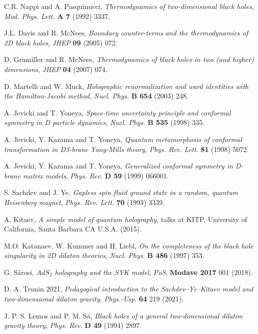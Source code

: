 \documentclass[sn-mathphys,Numbered]{sn-jnl}%
\theoremstyle{thmstyleone}%
\theoremstyle{thmstyletwo}%
\theoremstyle{thmstylethree}%
\begin{document}
\begin{thebibliography}{99}
 C.R. Nappi and A. Pasquinucci, \emph{Thermodynamics of two-dimensional black holes}, \emph{Mod. Phys.
Lett.} {\bf A 7} (1992) 3337.

 J.L. Davis and R. McNees, \emph{Boundary counter-terms and the thermodynamics of 2D black
holes}, \emph{JHEP} {\bf 09} (2005) 072.

 D. Grumiller and R. McNees, \emph{Thermodynamics of black holes in two (and higher) dimensions}, \emph{JHEP} {\bf 04} (2007) 074. 

 D. Martelli and W. Muck, \emph{Holographic renormalization and ward identities with the
Hamilton-Jacobi method}, \emph{Nucl. Phys.} {\bf B 654} (2003) 248.

A. Jevicki and T. Yoneya, \emph{Space-time uncertainty principle and conformal symmetry in D
particle dynamics}, \emph{Nucl. Phys.} {\bf B 535} (1998) 335.

A. Jevicki, Y. Kazama and T. Yoneya, \emph{Quantum metamorphosis of conformal transformation in D3-brane Yang-Mills theory}, \emph{Phys. Rev. Lett.} {\bf 81} (1998) 5072.

A. Jevicki, Y. Kazama and T. Yoneya, \emph{Generalized conformal symmetry in D-brane matrix models}, \emph{Phys. Rev.} {\bf D 59} (1999) 066001.

S. Sachdev and J. Ye, \emph{Gapless spin fluid ground state in a random, quantum Heisenberg
magnet}, \emph{Phys. Rev. Lett.} {\bf70} (1993) 3339.

A. Kitaev, \emph{A simple model of quantum holography}, talks at KITP, University of
California, Santa Barbara CA U.S.A. (2015).

M.O. Katanaev, W. Kummer and H. Liebl, \emph{On the completeness of the black hole singularity in 2D dilaton theories}, \emph{Nucl. Phys.} {\bf B 486} (1997) 353. 

G. Sárosi, \emph{$AdS_2$ holography and the SYK model}, \emph{PoS}, {\bf Modave 2017} 001 (2018). 

D. A. Trunin 2021, \emph{Pedagogical introduction to the Sachdev–Ye–Kitaev model and two-dimensional dilaton gravity}, \emph{Phys.-Usp.} {\bf 64} 219 (2021).

 J. P. S. Lemos and P. M. Sá, \emph{Black holes of a general two-dimensional dilaton gravity theory}, \emph{Phys. Rev.} {\bf D 49} (1994) 2897.


\end{thebibliography}
\end{document}
